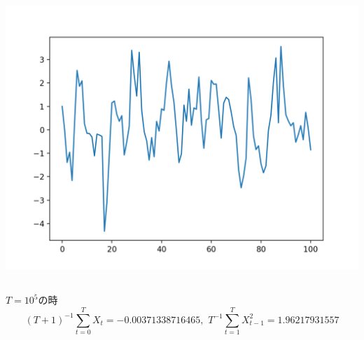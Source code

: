 \documentclass{jsarticle}
\begin{document}
\subsection{}
\includegraphics{2.png}

\subsection{}
$T=10^5$の時
\[
(T+1)^{-1} \sum_{t=0}^{T} X_{t} = -0.00371338716465, \,\, T^{-1}\sum_{t=1}^{T} X_{t-1}^2 = 1.96217931557
\]
\end{document}
